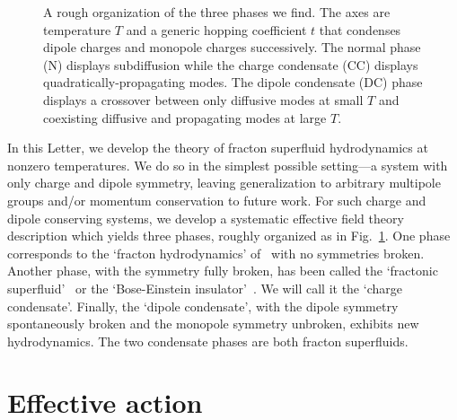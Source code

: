 \begin{figure}[th!]
    \centering
{}
    \caption[A rough organization of the three hydrodynamic phases]{A rough organization of the three phases we find. The axes are temperature $T$ and a generic hopping coefficient $t$ that condenses dipole charges and monopole charges successively. The normal phase (N) displays subdiffusion while the charge condensate (CC) displays quadratically-propagating modes. The dipole condensate (DC) phase displays a crossover between only diffusive modes at small $T$ and coexisting diffusive and propagating modes at large $T$.}
    \label{fig:phasediagram}
\end{figure}

In this Letter, we develop the theory of fracton superfluid hydrodynamics at nonzero temperatures. We do so in the simplest possible setting---a system with only charge and dipole symmetry, leaving generalization to arbitrary multipole groups and/or momentum conservation to future work. 
For such charge and dipole conserving systems, we develop a systematic effective field theory description which yields three phases, roughly organized as in Fig.~\ref{fig:phasediagram}. One phase corresponds to the `fracton hydrodynamics' of~\cite{Gromov2020Fracton} with no symmetries broken. Another phase, with the symmetry fully broken, has been called the `fractonic superfluid'~\cite{Yuan2020Fractonic} or the `Bose-Einstein insulator'~\cite{Lake2022Dipolar}. We will call it the `charge condensate'. Finally, the `dipole condensate', with the dipole symmetry spontaneously broken and the monopole symmetry unbroken, exhibits new hydrodynamics. The two condensate phases are both fracton superfluids.

\section{Effective action}

